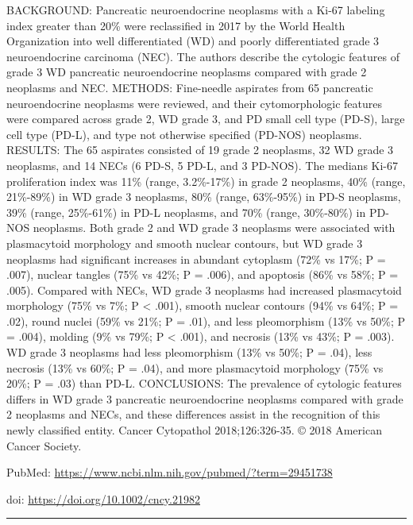 \documentclass[]{article}
\begin{document}
BACKGROUND: Pancreatic neuroendocrine neoplasms with a Ki-67 labeling
index greater than 20\% were reclassified in 2017 by the World Health
Organization into well differentiated (WD) and poorly differentiated
grade 3 neuroendocrine carcinoma (NEC). The authors describe the
cytologic features of grade 3 WD pancreatic neuroendocrine neoplasms
compared with grade 2 neoplasms and NEC. METHODS: Fine-needle aspirates
from 65 pancreatic neuroendocrine neoplasms were reviewed, and their
cytomorphologic features were compared across grade 2, WD grade 3, and
PD small cell type (PD-S), large cell type (PD-L), and type not
otherwise specified (PD-NOS) neoplasms. RESULTS: The 65 aspirates
consisted of 19 grade 2 neoplasms, 32 WD grade 3 neoplasms, and 14 NECs
(6 PD-S, 5 PD-L, and 3 PD-NOS). The medians Ki-67 proliferation index
was 11\% (range, 3.2\%-17\%) in grade 2 neoplasms, 40\% (range,
21\%-89\%) in WD grade 3 neoplasms, 80\% (range, 63\%-95\%) in PD-S
neoplasms, 39\% (range, 25\%-61\%) in PD-L neoplasms, and 70\% (range,
30\%-80\%) in PD-NOS neoplasms. Both grade 2 and WD grade 3 neoplasms
were associated with plasmacytoid morphology and smooth nuclear
contours, but WD grade 3 neoplasms had significant increases in abundant
cytoplasm (72\% vs 17\%; P = .007), nuclear tangles (75\% vs 42\%; P =
.006), and apoptosis (86\% vs 58\%; P = .005). Compared with NECs, WD
grade 3 neoplasms had increased plasmacytoid morphology (75\% vs 7\%; P
\textless{} .001), smooth nuclear contours (94\% vs 64\%; P = .02),
round nuclei (59\% vs 21\%; P = .01), and less pleomorphism (13\% vs
50\%; P = .004), molding (9\% vs 79\%; P \textless{} .001), and necrosis
(13\% vs 43\%; P = .003). WD grade 3 neoplasms had less pleomorphism
(13\% vs 50\%; P = .04), less necrosis (13\% vs 60\%; P = .04), and more
plasmacytoid morphology (75\% vs 20\%; P = .03) than PD-L. CONCLUSIONS:
The prevalence of cytologic features differs in WD grade 3 pancreatic
neuroendocrine neoplasms compared with grade 2 neoplasms and NECs, and
these differences assist in the recognition of this newly classified
entity. Cancer Cytopathol 2018;126:326-35. © 2018 American Cancer
Society.

PubMed: \url{https://www.ncbi.nlm.nih.gov/pubmed/?term=29451738}

doi: \url{https://doi.org/10.1002/cncy.21982}

{}

{}

\begin{center}\rule{0.5\linewidth}{\linethickness}\end{center}
\end{document}
